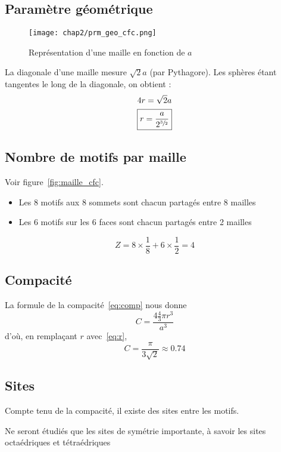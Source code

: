 \subsection{Paramètre géométrique}
\begin{figure}
    \centering
    \texttt{[image: chap2/prm\_geo\_cfc.png]}
    \caption{Représentation d'une maille en fonction de $a$}\label{fig:prm_geo_cfc}
\end{figure}

La diagonale d'une maille mesure $\sqrt{2}a$ (par Pythagore).
Les sphères étant tangentes le long de la diagonale, on obtient :
\begin{gather}
    4r = \sqrt{2}a \\
    \boxed{r = \frac{a}{2^{\sfrac{3}{2}}}} \label{eq:r}
\end{gather}
\subsection{Nombre de motifs par maille}
Voir figure~\ref{fig:maille_cfc}.
\begin{itemize}
    \item Les 8 motifs aux 8 sommets sont chacun partagés
        entre 8 mailles
    \item Les 6 motifs sur les 6 faces sont chacun partagés
        entre 2 mailles
\end{itemize}
\begin{equation}
    Z = 8 \times \frac{1}{8} + 6 \times \frac{1}{2} = 4
\end{equation}
\subsection{Compacité}
La formule de la compacité~\ref{eq:comp} nous donne
\begin{equation*}
    C = \frac{4 \frac{4}{3} \pi r^3}{a^3}
\end{equation*}
d'où, en remplaçant $r$ avec~\ref{eq:r},
\begin{equation}
    \boxed{C = \frac{\pi}{3\sqrt{2}} \approx 0.74}
\end{equation}

\subsection{Sites}
Compte tenu de la compacité, il existe des sites entre les motifs.
\begin{rem}
    Ne seront étudiés que les sites de symétrie importante,
    à savoir les sites octaédriques et tétraédriques
\end{rem}
